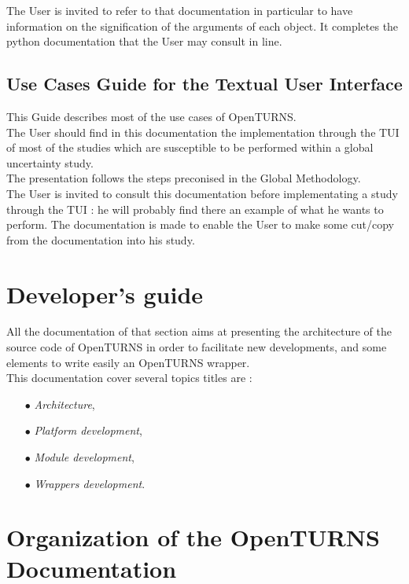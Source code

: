 \documentclass[11pt]{article}
\begin{document}
The User is invited to refer to that documentation in particular to have information on the signification of the arguments of each object. It completes the python documentation that the User may consult in line.

\subsection{Use Cases Guide for the Textual User Interface}

This Guide describes most of the use cases of OpenTURNS.\\

The User should find in this documentation the implementation through the TUI of most of the studies which are susceptible to be performed within a global uncertainty study.\\

The presentation follows the steps preconised in the Global Methodology.\\

The User is invited to consult this documentation before implementating a study through the TUI : he will probably find there an example of what he wants to perform. The documentation is made to enable the User to make some cut/copy from the documentation into his study.

\section{Developer's guide}

All the documentation of that section aims at presenting the architecture of the source code of OpenTURNS in order to facilitate new developments, and some elements to write easily an OpenTURNS wrapper.\\

This documentation cover several topics titles are :
\begin{itemize}
\item[$\bullet$] {\itshape Architecture},
\item[$\bullet$] {\itshape Platform development},
\item[$\bullet$] {\itshape Module development},
\item[$\bullet$] {\itshape Wrappers development}.
\end{itemize}

\section{Organization of the OpenTURNS Documentation}
\end{document}
